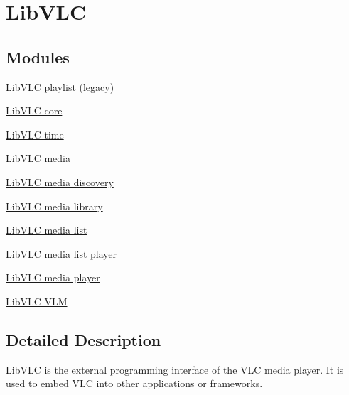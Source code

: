 \hypertarget{group__libvlc}{}\section{Lib\+V\+LC}
\label{group__libvlc}
\subsection*{Modules}
\begin{DoxyCompactItemize}
\item 
\hyperlink{group__libvlc__playlist}{Lib\+V\+L\+C playlist (legacy)}
\item 
\hyperlink{group__libvlc__core}{Lib\+V\+L\+C core}
\item 
\hyperlink{group__libvlc__clock}{Lib\+V\+L\+C time}
\item 
\hyperlink{group__libvlc__media}{Lib\+V\+L\+C media}
\item 
\hyperlink{group__libvlc__media__discoverer}{Lib\+V\+L\+C media discovery}
\item 
\hyperlink{group__libvlc__media__library}{Lib\+V\+L\+C media library}
\item 
\hyperlink{group__libvlc__media__list}{Lib\+V\+L\+C media list}
\item 
\hyperlink{group__libvlc__media__list__player}{Lib\+V\+L\+C media list player}
\item 
\hyperlink{group__libvlc__media__player}{Lib\+V\+L\+C media player}
\item 
\hyperlink{group__libvlc__vlm}{Lib\+V\+L\+C V\+LM}
\end{DoxyCompactItemize}


\subsection{Detailed Description}
Lib\+V\+LC is the external programming interface of the V\+LC media player. It is used to embed V\+LC into other applications or frameworks. 